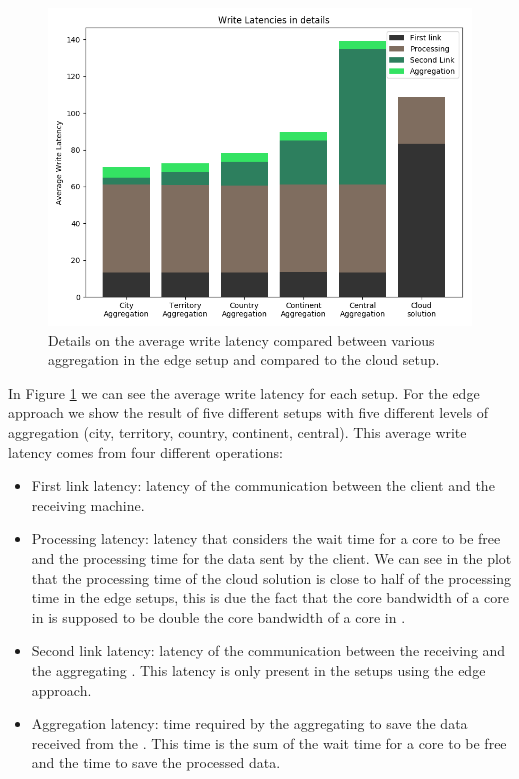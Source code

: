 \begin{figure}[H]
    \centering
    \includegraphics[width=0.86\linewidth]{Figures/Evaluation/write-by-latency2.png}
    \caption{Details on the average write latency compared between various aggregation in the edge setup and compared to the cloud setup.}
    \label{fig:write-by-latency2}
\end{figure}

In Figure \ref{fig:write-by-latency2} we can see the average write latency for each setup. For the edge approach we show the result of five different setups with five different levels of aggregation (city, territory, country, continent, central).
This average write latency comes from four different operations:
\begin{itemize}
    \item First link latency: latency of the communication between the client and the receiving machine.
    \item Processing latency: latency that considers the wait time for a core to be free and the processing time for the data sent by the client. We can see in the plot that the processing time of the cloud solution is close to half of the processing time in the edge setups, this is due the fact that the core bandwidth of a core in  is supposed to be double the core bandwidth of a core in .
    \item Second link latency: latency of the communication between the receiving   and the aggregating . This latency is only present in the setups using the edge approach.
    \item Aggregation latency: time required by the aggregating  to save the data received from the . This time is the sum of the wait time for a core to be free and the time to save the processed data.
\end{itemize}

